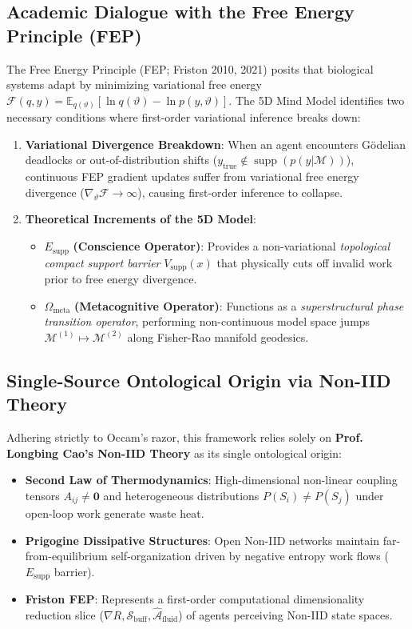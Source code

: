 \documentclass[journal,twocolumn,10pt]{IEEEtran}
\begin{document}
\subsection{Academic Dialogue with the Free Energy Principle (FEP)}
The Free Energy Principle (FEP; Friston 2010, 2021) posits that biological systems adapt by minimizing variational free energy $\mathcal{F}(q, y) = \mathbb{E}_{q(\vartheta)}[\ln q(\vartheta) - \ln p(y, \vartheta)]$. The 5D Mind Model identifies two necessary conditions where first-order variational inference breaks down:
\begin{enumerate}
    \item \textbf{Variational Divergence Breakdown}: When an agent encounters G\"odelian deadlocks or out-of-distribution shifts ($y_{\text{true}} \notin \operatorname{supp}(p(y|\mathcal{M}))$), continuous FEP gradient updates suffer from variational free energy divergence ($\nabla_{\vartheta} \mathcal{F} \to \infty$), causing first-order inference to collapse.
    \item \textbf{Theoretical Increments of the 5D Model}:
    \begin{itemize}
        \item $E_{\text{supp}}$ \textbf{(Conscience Operator)}: Provides a non-variational \emph{topological compact support barrier} $V_{\text{supp}}(x)$ that physically cuts off invalid work prior to free energy divergence.
        \item $\hat{\Omega}_{\text{meta}}$ \textbf{(Metacognitive Operator)}: Functions as a \emph{superstructural phase transition operator}, performing non-continuous model space jumps $\mathcal{M}^{(1)} \mapsto \mathcal{M}^{(2)}$ along Fisher-Rao manifold geodesics.
    \end{itemize}
\end{enumerate}

\subsection{Single-Source Ontological Origin via Non-IID Theory}
Adhering strictly to Occam's razor, this framework relies solely on \textbf{Prof. Longbing Cao's Non-IID Theory} \cite{cao2014non} as its single ontological origin:
\begin{itemize}
    \item \textbf{Second Law of Thermodynamics}: High-dimensional non-linear coupling tensors $A_{ij} \neq \mathbf{0}$ and heterogeneous distributions $P(S_i) \neq P(S_j)$ under open-loop work generate waste heat.
    \item \textbf{Prigogine Dissipative Structures}: Open Non-IID networks maintain far-from-equilibrium self-organization driven by negative entropy work flows ($E_{\text{supp}}$ barrier).
    \item \textbf{Friston FEP}: Represents a first-order computational dimensionality reduction slice ($\nabla R, \mathcal{S}_{\text{buff}}, \hat{\mathcal{A}}_{\text{fluid}}$) of agents perceiving Non-IID state spaces.
\end{itemize}
\end{document}
